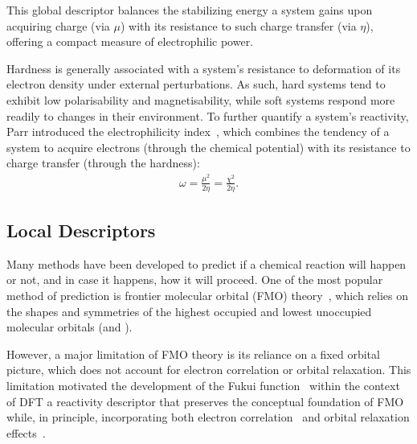 \vspace{1em}%
This global descriptor balances the stabilizing energy a system gains upon 
acquiring charge (via $\mu$) with its resistance to such charge transfer 
(via $\eta$), offering a compact measure of electrophilic power.

\vspace{1em}%
Hardness is generally associated with a system's resistance to deformation of
its electron density under external perturbations. As such, hard systems tend
to exhibit low polarisability and magnetisability, while soft systems respond
more readily to changes in their environment. To further quantify a system's
reactivity, Parr introduced the electrophilicity
index~\cite{Parr1999}, which combines the tendency of a system to acquire
electrons (through the chemical potential) with its resistance to charge
transfer (through the hardness):
%
\begin{align}
  \omega = \frac{\mu^2}{2\eta} = \frac{\chi^2}{2\eta}.
\end{align}

\newpage
\subsection{Local Descriptors}

Many methods have been developed to predict if a chemical reaction will happen
or not, and in case it happens, how it will proceed. One of the most popular
method of prediction is frontier molecular orbital (\gls{FMO})
theory~\cite{Albright2013}, which relies on the shapes and symmetries of the
highest occupied and lowest unoccupied molecular orbitals (\homo and
\lumo).

\vspace{1em}%
However, a major limitation of \gls{FMO} theory is its reliance on a fixed
orbital picture, which does not account for electron correlation or orbital
relaxation. This limitation motivated the development of the Fukui
function~\cite{Ayers2000, Yang1984, Parr1984} within the context of DFT a
reactivity descriptor that preserves the conceptual foundation of \gls{FMO}
while, in principle, incorporating both electron correlation~\cite{Melin2005}
and orbital relaxation effects~\cite{Yang1984, Bartolotti2005, Anderson2007}.

\vspace{1em}%

